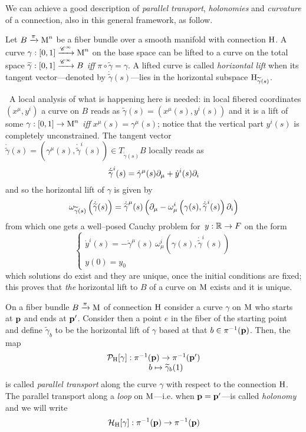 We can achieve a good description of \emph{parallel transport}, \emph{holonomies} and \emph{curvature} of a connection, also in this general framework, as follow.

\begin{defi}
    Let $B\xrightarrow{\pi}\text{\normalfont M}^n$ be a fiber bundle over a smooth manifold with connection $\text{\normalfont H}$. A curve $\gamma:[0,1]\xrightarrow{\mathscr{C}^\infty}\text{\normalfont M}^n$ on the base space can be lifted to a curve on the total space $\widetilde{\gamma}:[0,1]\xrightarrow{\mathscr{C}^\infty}B$ \emph{iff} $\pi\circ\widetilde{\gamma}=\gamma$. A lifted curve is called \emph{horizontal lift} when its tangent vector---denoted by $\dot{\widetilde{\gamma}}(s)$---lies in the horizontal subspace $\text{\normalfont H}_{\widetilde{\gamma}(s)}$.  
\end{defi}
\,\newline
A local analysis of what is happening here is needed: in local fibered coordinates $(x^\mu,y^i)$ a curve on $B$ reads as $\widetilde{\gamma}(s)=(x^\mu(s),y^i(s))$ and it is a lift of some $\gamma:[0,1]\to\text{\normalfont M}^n$ \emph{iff} $x^\mu(s)=\gamma^\mu(s)$; notice that the vertical part $y^i(s)$ is completely unconstrained. The tangent vector $\dot{\widetilde{\gamma}}(s)=(\gamma^\mu(s),{\dot{\widetilde{\gamma}}}^i(s))\in T_{\dot{\widetilde{\gamma}}(s)}B$ locally reads as
$${\dot{\widetilde{\gamma}}}^i(s)=\dot{\gamma}^\mu(s)\partial_\mu+\dot{y}^i(s)\partial_i$$
and so the horizontal lift of $\gamma$ is given by
$$\omega_{\widetilde{\gamma}(s)}\left({\dot{\widetilde{\gamma}}}(s)\right)={\dot{\widetilde{\gamma}}}^\mu(s)\left(\partial_\mu-\omega^i_\mu\left(\gamma(s),{\dot{\widetilde{\gamma}}}^i(s)\right)\partial_i\right)$$
from which one gets a well--posed Cauchy problem for $\,y:\mathbb{R}\to F$ on the form
$$\begin{cases}
    \dot{y}^i(s)=-\dot{\gamma}^\mu(s)\,\omega^i_\mu\left(\gamma(s),{\dot{\widetilde{\gamma}}}^i(s)\right)\\
    y(0)=y_0
\end{cases}$$
which solutions do exist and they are unique, once the initial conditions are fixed; this proves that \emph{the} horizontal lift to $B$ of a curve on $\text{\normalfont M}$ exists and it is unique.
\begin{defi}\label{holonomies_def}
    On a fiber bundle $B\xrightarrow{\pi}\text{\normalfont M}$ of connection $\text{\normalfont H}$ consider a curve $\gamma$ on $\text{\normalfont M}$ who starts at $\mathbf{p}$ and ends at $\mathbf{p}'$. Consider then a point $e$ in the fiber of the starting point and define $\widetilde{\gamma}_b$ to be the horizontal lift of $\gamma$ based at that $b\in\pi^{-1}(\mathbf{p})$. Then, the map
    $$\begin{matrix}
        \mathcal{P}_{\text{\normalfont H}}[\gamma]:\pi^{-1}(\mathbf{p})\to\pi^{-1}(\mathbf{p}')\\
        \qquad\quad b\mapsto{\widetilde{\gamma}}_b(1)
    \end{matrix}$$
    is called \emph{parallel transport} along the curve $\gamma$ with respect to the connection $\text{\normalfont H}$. The parallel transport along a \emph{loop} on $\text{\normalfont M}$---i.e. when $\mathbf{p}=\mathbf{p}'$---is called \emph{holonomy} and we will write
    $$\mathcal{H}_{\text{\normalfont H}}[\gamma]:\pi^{-1}(\mathbf{p})\to\pi^{-1}(\mathbf{p})$$
\end{defi}

